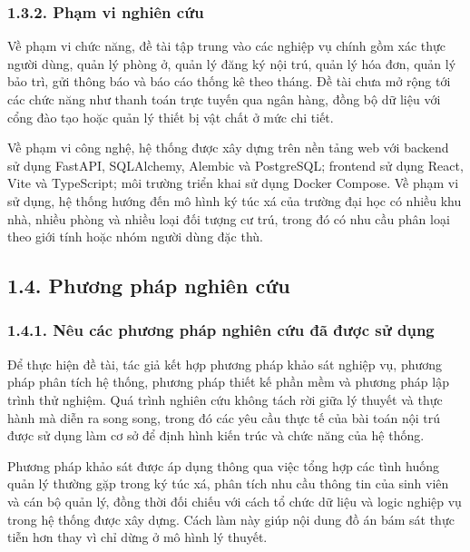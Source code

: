 \documentclass[12pt]{article}
\begin{document}
\subsubsection*{1.3.2. Phạm vi nghiên cứu}


Về phạm vi chức năng, đề tài tập trung vào các nghiệp vụ chính gồm xác thực người dùng, quản lý phòng ở, quản lý đăng ký nội trú, quản lý hóa đơn, quản lý bảo trì, gửi thông báo và báo cáo thống kê theo tháng. Đề tài chưa mở rộng tới các chức năng như thanh toán trực tuyến qua ngân hàng, đồng bộ dữ liệu với cổng đào tạo hoặc quản lý thiết bị vật chất ở mức chi tiết.

Về phạm vi công nghệ, hệ thống được xây dựng trên nền tảng web với backend sử dụng FastAPI, SQLAlchemy, Alembic và PostgreSQL; frontend sử dụng React, Vite và TypeScript; môi trường triển khai sử dụng Docker Compose. Về phạm vi sử dụng, hệ thống hướng đến mô hình ký túc xá của trường đại học có nhiều khu nhà, nhiều phòng và nhiều loại đối tượng cư trú, trong đó có nhu cầu phân loại theo giới tính hoặc nhóm người dùng đặc thù.

\subsection*{1.4. Phương pháp nghiên cứu}

\subsubsection*{1.4.1. Nêu các phương pháp nghiên cứu đã được sử dụng}

Để thực hiện đề tài, tác giả kết hợp phương pháp khảo sát nghiệp vụ, phương pháp phân tích hệ thống, phương pháp thiết kế phần mềm và phương pháp lập trình thử nghiệm. Quá trình nghiên cứu không tách rời giữa lý thuyết và thực hành mà diễn ra song song, trong đó các yêu cầu thực tế của bài toán nội trú được sử dụng làm cơ sở để định hình kiến trúc và chức năng của hệ thống.

Phương pháp khảo sát được áp dụng thông qua việc tổng hợp các tình huống quản lý thường gặp trong ký túc xá, phân tích nhu cầu thông tin của sinh viên và cán bộ quản lý, đồng thời đối chiếu với cách tổ chức dữ liệu và logic nghiệp vụ trong hệ thống được xây dựng. Cách làm này giúp nội dung đồ án bám sát thực tiễn hơn thay vì chỉ dừng ở mô hình lý thuyết.
\end{document}
